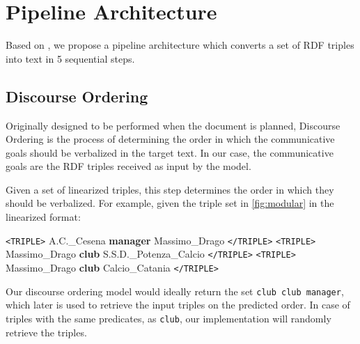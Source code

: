 \documentclass[11pt,a4paper]{article}
\begin{document}
\section{Pipeline Architecture}

Based on \citet{reiter2000}, we propose a pipeline architecture which converts a set of RDF triples into text in 5 sequential steps.



















\subsection{Discourse Ordering}

Originally designed to be performed when the document is planned, Discourse Ordering is the process of determining the order in which the communicative goals should be verbalized in the target text. In our case, the communicative goals are the RDF triples received as input by the model.

Given a set of linearized triples, this step determines the order in which they should be verbalized. For example, given the triple set in \autoref{fig:modular} in the linearized format:



\vspace{0.3cm}
\begin{displayquote}
    \footnotesize
    \vspace{0.1cm}
    \noindent \texttt{<TRIPLE>} A.C.\_Cesena \textbf{manager} Massimo\_Drago \texttt{</TRIPLE>} \texttt{<TRIPLE>} Massimo\_Drago \textbf{club} S.S.D.\_Potenza\_Calcio \texttt{</TRIPLE>} \texttt{<TRIPLE>} Massimo\_Drago \textbf{club} Calcio\_Catania \texttt{</TRIPLE>}
\vspace{0.1cm}
\end{displayquote}
\vspace{0.2cm}

Our discourse ordering model would ideally return the set \texttt{club club manager}, which later is used to retrieve the input triples on the predicted order. In case of triples with the same predicates, as \texttt{club}, our implementation will randomly retrieve the triples.
\end{document}
